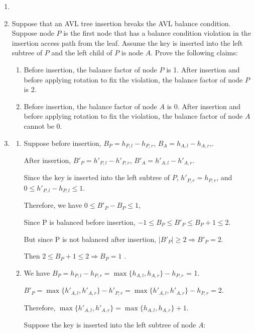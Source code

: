 \documentclass[12pt,a4paper]{article}
\makeatletter
\newtheorem*{solution}{Solution}
\theoremstyle{definition}
\renewenvironment{solution}[1][Solution] {\par\pushQED{\qed}\normalfont\topsep6\p@\@plus6\p@\relax\trivlist\item[\hskip\labelsep\bfseries#1\@addpunct{.}]\ignorespaces}{\popQED\endtrivlist\@endpefalse} \makeatother
\makeatother
\begin{document}
\begin{enumerate}
\begin{solution}
		
	\end{solution}

\newpage
\item  Suppose that an AVL tree insertion breaks the AVL balance condition. Suppose node $P$ is the ﬁrst node that has a balance condition violation in the insertion access path from the leaf. Assume the key is inserted into the left subtree of $P$ and the left child of $P$ is node $A$. Prove the following claims:
	\begin{enumerate}
		\item  Before insertion, the balance factor of node $P$ is 1. After insertion and before applying rotation to ﬁx the violation, the balance factor of node $P$ is 2.
		\item Before insertion, the balance factor of node $A$ is 0. After insertion and before applying rotation to ﬁx the violation, the balance factor of node $A$ cannot be 0.
	\end{enumerate}
	
	\begin{solution} 
				\hspace*{\fill}
		\begin{enumerate}
			\item 
		Suppose before insertion, 
		$B_P = h_{P,l} - h_{P,r}$, $B_A = h_{A,l} - h_{A,r}$,.
		
		After insertion, 
		$B'_P = h'_{P,l} - h'_{P,r}$, $B'_A = h'_{A,l} - h'_{A,r}$.
		 
		Since the key is inserted into the left subtree of $P$, $h'_{P,r} = h_{P,r}$, and $0 \leq h'_{P,l} - h_{P,l} \leq 1$.
		
		Therefore, we have $0 \leq B'_P - B_P \leq 1$, 
		
		Since P is balanced before insertion, $-1 \leq B_P \leq B'_{P} \leq B_P+1 \leq  2$.
		
		But since P is not balanced after insertion, $|B'_P| \geq 2 \Rightarrow B'_P = 2$.
		
		Then $2 \leq B_P + 1 \leq 2 \Rightarrow B_P = 1$ .
		
		\item 
		We have $B_P = h_{P,l} - h_{P,r} = \max\{ h_{A,l}, h_{A,r}\} - h_{P,r}$ = 1.
		
		$B'_P = \max\{ h'_{A,l}, h'_{A,r}\} - h'_{P,r} =\max\{ h'_{A,l}, h'_{A,r}\} - h_{P,r} = 2$.
		
		Therefore, $\max\{ h'_{A,l}, h'_{A,r}\}  = \max\{ h_{A,l}, h_{A,r}\}  + 1$.
		
		Suppose the key is inserted into the left subtree of node $A$:
		

\end{enumerate}
\end{solution}
\end{enumerate}
\end{document}
